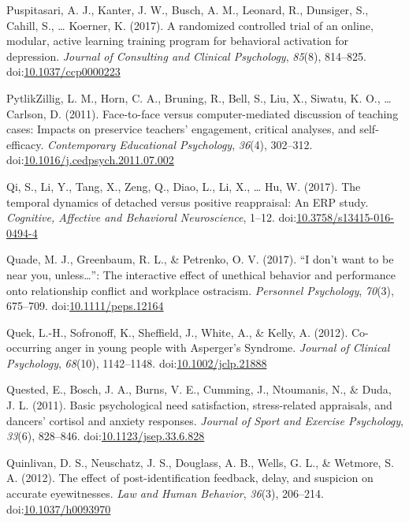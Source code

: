 \documentclass[english,man]{apa6}
\theoremstyle{definition}
\theoremstyle{definition}
\theoremstyle{definition}
\theoremstyle{remark}
\begin{document}
\hypertarget{ref-Puspitasari2017a}{}
Puspitasari, A. J., Kanter, J. W., Busch, A. M., Leonard, R., Dunsiger,
S., Cahill, S., \ldots{} Koerner, K. (2017). A randomized controlled
trial of an online, modular, active learning training program for
behavioral activation for depression. \emph{Journal of Consulting and
Clinical Psychology}, \emph{85}(8), 814--825.
doi:\href{https://doi.org/10.1037/ccp0000223}{10.1037/ccp0000223}

\hypertarget{ref-PytlikZillig2011}{}
PytlikZillig, L. M., Horn, C. A., Bruning, R., Bell, S., Liu, X.,
Siwatu, K. O., \ldots{} Carlson, D. (2011). Face-to-face versus
computer-mediated discussion of teaching cases: Impacts on preservice
teachers' engagement, critical analyses, and self-efficacy.
\emph{Contemporary Educational Psychology}, \emph{36}(4), 302--312.
doi:\href{https://doi.org/10.1016/j.cedpsych.2011.07.002}{10.1016/j.cedpsych.2011.07.002}

\hypertarget{ref-Qi2017}{}
Qi, S., Li, Y., Tang, X., Zeng, Q., Diao, L., Li, X., \ldots{} Hu, W.
(2017). The temporal dynamics of detached versus positive reappraisal:
An ERP study. \emph{Cognitive, Affective and Behavioral Neuroscience},
1--12.
doi:\href{https://doi.org/10.3758/s13415-016-0494-4}{10.3758/s13415-016-0494-4}

\hypertarget{ref-Quade2017}{}
Quade, M. J., Greenbaum, R. L., \& Petrenko, O. V. (2017). ``I don't
want to be near you, unless\ldots{}'': The interactive effect of
unethical behavior and performance onto relationship conflict and
workplace ostracism. \emph{Personnel Psychology}, \emph{70}(3),
675--709.
doi:\href{https://doi.org/10.1111/peps.12164}{10.1111/peps.12164}

\hypertarget{ref-Quek2012}{}
Quek, L.-H., Sofronoff, K., Sheffield, J., White, A., \& Kelly, A.
(2012). Co-occurring anger in young people with Asperger's Syndrome.
\emph{Journal of Clinical Psychology}, \emph{68}(10), 1142--1148.
doi:\href{https://doi.org/10.1002/jclp.21888}{10.1002/jclp.21888}

\hypertarget{ref-Quested2011}{}
Quested, E., Bosch, J. A., Burns, V. E., Cumming, J., Ntoumanis, N., \&
Duda, J. L. (2011). Basic psychological need satisfaction,
stress-related appraisals, and dancers' cortisol and anxiety responses.
\emph{Journal of Sport and Exercise Psychology}, \emph{33}(6), 828--846.
doi:\href{https://doi.org/10.1123/jsep.33.6.828}{10.1123/jsep.33.6.828}

\hypertarget{ref-Quinlivan2011}{}
Quinlivan, D. S., Neuschatz, J. S., Douglass, A. B., Wells, G. L., \&
Wetmore, S. A. (2012). The effect of post-identification feedback,
delay, and suspicion on accurate eyewitnesses. \emph{Law and Human
Behavior}, \emph{36}(3), 206--214.
doi:\href{https://doi.org/10.1037/h0093970}{10.1037/h0093970}
\end{document}
